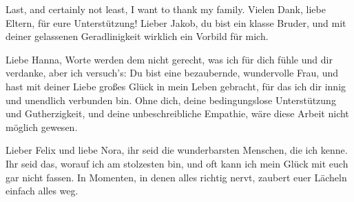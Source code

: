 \documentclass[
12pt, %
ngerman,
english, %
onehalfspacing,
hidelinks,
toctotoc, %
headsepline, %
]{MastersDoctoralThesis} %
\begin{document}
\begin{acknowledgements}
\vspace{\baselineskip}

Last, and certainly not least, I want to thank my family. Vielen Dank, liebe Eltern, für eure Unterstützung! Lieber Jakob, du bist ein klasse Bruder, und mit deiner gelassenen Geradlinigkeit wirklich ein Vorbild für mich.

\vspace{\baselineskip}

Liebe Hanna, Worte werden dem nicht gerecht, was ich für dich fühle und dir verdanke, aber ich versuch's: Du bist eine bezaubernde, wundervolle Frau, und hast mit deiner Liebe großes Glück in mein Leben gebracht, für das ich dir innig und unendlich verbunden bin. Ohne dich, deine bedingungslose Unterstützung und Gutherzigkeit, und deine unbeschreibliche Empathie, wäre diese Arbeit nicht möglich gewesen.

\vspace{\baselineskip}

Lieber Felix und liebe Nora, ihr seid die wunderbarsten Menschen, die ich kenne. Ihr seid das, worauf ich am stolzesten bin, und oft kann ich mein Glück mit euch gar nicht fassen. In Momenten, in denen alles richtig nervt, zaubert euer Lächeln einfach alles weg.



\end{acknowledgements}



\tableofcontents %

\listoffigures %

\listoftables %

\end{document}
